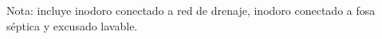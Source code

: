 Nota: incluye inodoro conectado a red de drenaje, inodoro conectado a fosa séptica y excusado lavable.
